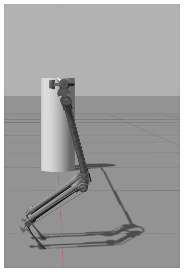 \begin{figure}[h]
\centering
  \begin{subfigure}{.19\textwidth}
    \includegraphics[width=\linewidth]{figures/gazebo_jumping_1.png}
  \end{subfigure}
  \begin{subfigure}{.19\textwidth}

\end{subfigure}
\end{figure}
